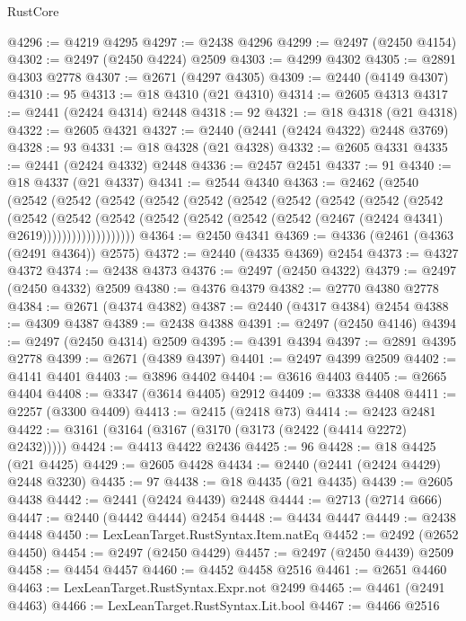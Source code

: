 \begin{lexlean}{RustCore}
\begin{coremodule}
@4296 := @4219 @4295
@4297 := @2438 @4296
@4299 := @2497 (@2450 @4154)
@4302 := @2497 (@2450 @4224) @2509
@4303 := @4299 @4302
@4305 := @2891 @4303 @2778
@4307 := @2671 (@4297 @4305)
@4309 := @2440 (@4149 @4307)
@4310 := 95
@4313 := @18 @4310 (@21 @4310)
@4314 := @2605 @4313
@4317 := @2441 (@2424 @4314) @2448
@4318 := 92
@4321 := @18 @4318 (@21 @4318)
@4322 := @2605 @4321
@4327 := @2440 (@2441 (@2424 @4322) @2448 @3769)
@4328 := 93
@4331 := @18 @4328 (@21 @4328)
@4332 := @2605 @4331
@4335 := @2441 (@2424 @4332) @2448
@4336 := @2457 @2451
@4337 := 91
@4340 := @18 @4337 (@21 @4337)
@4341 := @2544 @4340
@4363 := @2462
    (@2540
      (@2542
        (@2542
          (@2542
            (@2542
              (@2542
                (@2542
                  (@2542
                    (@2542
                      (@2542
                        (@2542
                          (@2542
                            (@2542
                              (@2542
                                (@2542
                                  (@2542 (@2542 (@2542 (@2467 (@2424 @4341) @2619)))))))))))))))))))
@4364 := @2450 @4341
@4369 := @4336 (@2461 (@4363 (@2491 @4364)) @2575)
@4372 := @2440 (@4335 @4369) @2454
@4373 := @4327 @4372
@4374 := @2438 @4373
@4376 := @2497 (@2450 @4322)
@4379 := @2497 (@2450 @4332) @2509
@4380 := @4376 @4379
@4382 := @2770 @4380 @2778
@4384 := @2671 (@4374 @4382)
@4387 := @2440 (@4317 @4384) @2454
@4388 := @4309 @4387
@4389 := @2438 @4388
@4391 := @2497 (@2450 @4146)
@4394 := @2497 (@2450 @4314) @2509
@4395 := @4391 @4394
@4397 := @2891 @4395 @2778
@4399 := @2671 (@4389 @4397)
@4401 := @2497 @4399 @2509
@4402 := @4141 @4401
@4403 := @3896 @4402
@4404 := @3616 @4403
@4405 := @2665 @4404
@4408 := @3347 (@3614 @4405) @2912
@4409 := @3338 @4408
@4411 := @2257 (@3300 @4409)
@4413 := @2415 (@2418 @73)
@4414 := @2423 @2481
@4422 := @3161 (@3164 (@3167 (@3170 (@3173 (@2422 (@4414 @2272) @2432)))))
@4424 := @4413 @4422 @2436
@4425 := 96
@4428 := @18 @4425 (@21 @4425)
@4429 := @2605 @4428
@4434 := @2440 (@2441 (@2424 @4429) @2448 @3230)
@4435 := 97
@4438 := @18 @4435 (@21 @4435)
@4439 := @2605 @4438
@4442 := @2441 (@2424 @4439) @2448
@4444 := @2713 (@2714 @666)
@4447 := @2440 (@4442 @4444) @2454
@4448 := @4434 @4447
@4449 := @2438 @4448
@4450 := LexLeanTarget.RustSyntax.Item.natEq
@4452 := @2492 (@2652 @4450)
@4454 := @2497 (@2450 @4429)
@4457 := @2497 (@2450 @4439) @2509
@4458 := @4454 @4457
@4460 := @4452 @4458 @2516
@4461 := @2651 @4460
@4463 := LexLeanTarget.RustSyntax.Expr.not @2499
@4465 := @4461 (@2491 @4463)
@4466 := LexLeanTarget.RustSyntax.Lit.bool
@4467 := @4466 @2516

\end{coremodule}
\end{lexlean}
